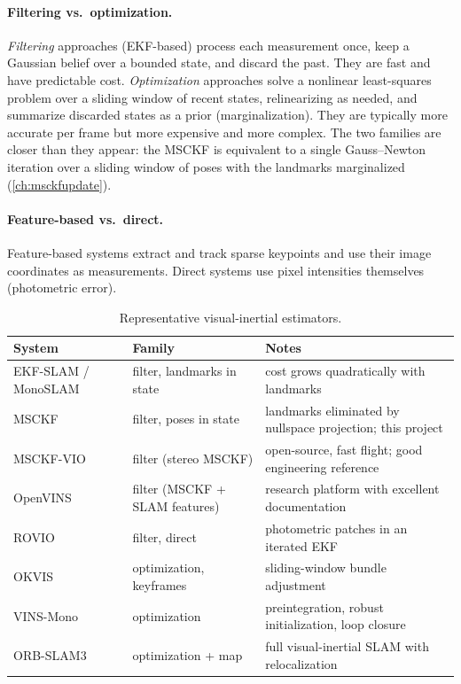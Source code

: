 \paragraph{Filtering vs.\ optimization.} \emph{Filtering} approaches (EKF-based) process each
measurement once, keep a Gaussian belief over a bounded state, and discard the past. They are fast
and have predictable cost. \emph{Optimization} approaches solve a nonlinear least-squares problem
over a sliding window of recent states, relinearizing as needed, and summarize discarded states as
a prior (marginalization). They are typically more accurate per frame but more expensive and more
complex. The two families are closer than they appear: the MSCKF is equivalent to a single
Gauss--Newton iteration over a sliding window of poses with the landmarks marginalized
(\cref{ch:msckfupdate}).

\paragraph{Feature-based vs.\ direct.} Feature-based systems extract and track sparse keypoints and
use their image coordinates as measurements. Direct systems use pixel intensities themselves
(photometric error).

\begin{table}[t]
\centering\small
\begin{tabularx}{\textwidth}{@{}l l >{\raggedright\arraybackslash}X@{}}
\toprule
\textbf{System} & \textbf{Family} & \textbf{Notes} \\
\midrule
EKF-SLAM / MonoSLAM~\cite{davison2007monoslam} & filter, landmarks in state & cost grows quadratically with landmarks \\
MSCKF~\cite{mourikis2007msckf, li2013msckf2} & filter, poses in state & landmarks eliminated by nullspace projection; this project \\
MSCKF-VIO~\cite{sun2018msckfvio} & filter (stereo MSCKF) & open-source, fast flight; good engineering reference \\
OpenVINS~\cite{geneva2020openvins} & filter (MSCKF + SLAM features) & research platform with excellent documentation \\
ROVIO~\cite{bloesch2015rovio} & filter, direct & photometric patches in an iterated EKF \\
OKVIS~\cite{leutenegger2015okvis} & optimization, keyframes & sliding-window bundle adjustment \\
VINS-Mono~\cite{qin2018vins} & optimization & preintegration, robust initialization, loop closure \\
ORB-SLAM3~\cite{campos2021orbslam3} & optimization + map & full visual-inertial SLAM with relocalization \\
\bottomrule
\end{tabularx}
\caption{Representative visual-inertial estimators.}
\label{tab:vio-systems}
\end{table}

